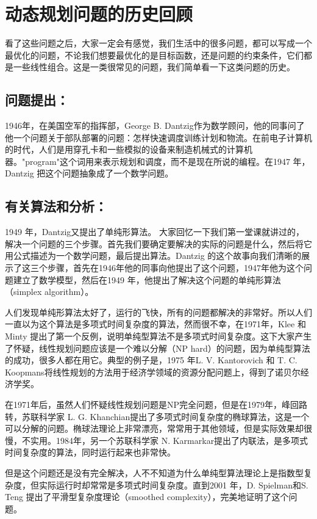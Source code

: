 \section{动态规划问题的历史回顾}

看了这些问题之后，大家一定会有感觉，我们生活中的很多问题，都可以写成一个最优化的问题，不论我们想要最优化的是目标函数，还是问题的约束条件，它们都是一些线性组合。这是一类很常见的问题，我们简单看一下这类问题的历史。

\subsection{问题提出：}
1946年，在美国空军的指挥部，George B. Dantzig作为数学顾问，他的同事问了他一个问题关于部队部署的问题：怎样快速调度训练计划和物流。在前电子计算机的时代，人们是用穿孔卡和一些模拟的设备来制造机械式的计算机器。"program"这个词用来表示规划和调度，而不是现在所说的编程。在1947 年，Dantzig 把这个问题抽象成了一个数学问题。

\subsection{ 有关算法和分析：}
1949 年，Dantzig又提出了单纯形算法。
大家回忆一下我们第一堂课就讲过的，解决一个问题的三个步骤。首先我们要确定要解决的实际的问题是什么，然后将它用公式描述为一个数学问题，最后提出算法。Dantzig 的这个故事向我们清晰的展示了这三个步骤，首先在1946年他的同事向他提出了这个问题，1947年他为这个问题建立了数学模型，然后在1949 年，他提出了解决这个问题的单纯形算法（simplex algorithm）。

人们发现单纯形算法太好了，运行的飞快，所有的问题都解决的非常好。所以人们一直以为这个算法是多项式时间复杂度的算法，然而很不幸，在1971年，Klee 和 Minty 提出了第一个反例，说明单纯型算法不是多项式时间复杂度。这下大家产生了怀疑，线性规划问题应该是一个难以分解（NP hard）的问题，因为单纯型算法的成功，很多人都在用它。典型的例子是，1975 年L. V. Kantorovich 和 T. C. Koopmans将线性规划的方法用于经济学领域的资源分配问题上，得到了诺贝尔经济学奖。

在1971年后，虽然人们怀疑线性规划问题是NP完全问题，但是在1979年，峰回路转，苏联科学家 L. G. Khanchian提出了多项式时间复杂度的椭球算法，这是一个可以分解的问题。椭球法理论上非常漂亮，常常用于其他领域，但是实际效果却很慢，不实用。1984年，另一个苏联科学家 N. Karmarkar提出了内联法，是多项式时间复杂度的算法，同时运行起来也非常快。

但是这个问题还是没有完全解决，人不不知道为什么单纯型算法理论上是指数型复杂度，但实际运行时却常常是多项式时间复杂度。直到2001 年，D. Spielman和S. Teng 提出了平滑型复杂度理论（smoothed complexity），完美地证明了这个问题。

